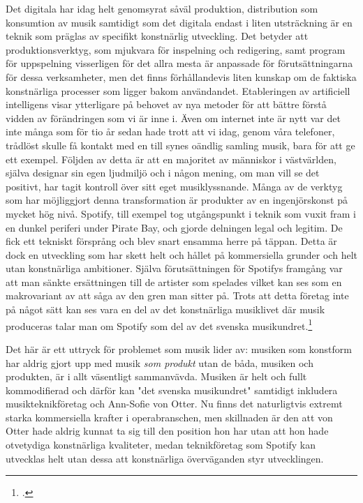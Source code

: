 \documentclass[11pt]{article}
\begin{document}
Det digitala har idag helt genomsyrat såväl produktion, distribution
som konsumtion av musik samtidigt som det digitala endast i liten
utsträckning är en teknik som präglas av specifikt konstnärlig
utveckling. Det betyder att produktionsverktyg, som mjukvara för
inspelning och redigering, samt program för uppspelning visserligen
för det allra mesta är anpassade för förutsättningarna för dessa
verksamheter, men det finns förhållandevis liten kunskap om de
faktiska konstnärliga processer som ligger bakom
användandet. Etableringen av artificiell intelligens visar ytterligare
på behovet av nya metoder för att bättre förstå vidden av förändringen
som vi är inne i. Även om internet inte är nytt var det inte många som
för tio år sedan hade trott att vi idag, genom våra telefoner,
trådlöst skulle få kontakt med en till synes oändlig samling musik,
bara för att ge ett exempel. Följden av detta är att en majoritet av
människor i västvärlden, själva designar sin egen ljudmiljö och i
någon mening, om man vill se det positivt, har tagit kontroll över
sitt eget musiklyssnande. Många av de verktyg som har möjliggjort
denna transformation är produkter av en ingenjörskonst på mycket hög
nivå. Spotify, till exempel tog utgångspunkt i teknik som vuxit fram i
en dunkel periferi under Pirate Bay, och gjorde delningen legal och
legitim. De fick ett tekniskt försprång och blev snart ensamma herre
på täppan. Detta är dock en utveckling som har skett helt och hållet
på kommersiella grunder och helt utan konstnärliga ambitioner. Själva
förutsättningen för Spotifys framgång var att man sänkte ersättningen
till de artister som spelades vilket kan ses som en makrovariant av
att såga av den gren man sitter på. Trots att detta företag inte på
något sätt kan ses vara en del av det konstnärliga musiklivet där musik
produceras talar man om Spotify som del av det svenska
musikundret.\footcite{konig2018}

Det här är ett uttryck för problemet som musik lider av: musiken som
konstform har aldrig gjort upp med musik \emph{som produkt} utan de
båda, musiken och produkten, är i allt väsentligt sammanvävda. Musiken
är helt och fullt kommodifierad och därför kan "det svenska
musikundret" samtidigt inkludera musikteknikföretag och Ann-Sofie von
Otter. Nu finns det naturligtvis extremt starka kommersiella krafter i
operabranschen, men skillnaden är den att von Otter hade aldrig kunnat
ta sig till den position hon har utan att hon hade otvetydiga
konstnärliga kvaliteter, medan teknikföretag som
Spotify kan utvecklas helt utan dessa att konstnärliga överväganden
styr utvecklingen.
\end{document}
